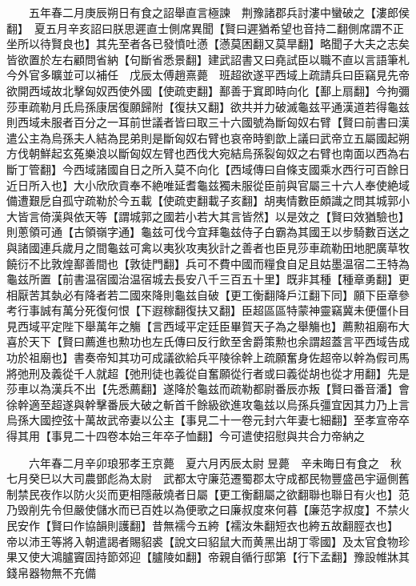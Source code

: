 　　五年春二月庚辰朔日有食之詔舉直言極諫　荆豫諸郡兵討漊中蠻破之【漊郎侯翻】　夏五月辛亥詔曰朕思遲直士側席異聞【賢曰遲猶希望也音持二翻側席謂不正坐所以待賢良也】其先至者各已發憤吐懣【懣莫困翻又莫旱翻】略聞子大夫之志矣皆欲置於左右顧問省納【句斷省悉景翻】建武詔書又曰堯試臣以職不直以言語筆札今外官多曠並可以補任　戊辰太傅趙熹薨　班超欲遂平西域上疏請兵曰臣竊見先帝欲開西域故北擊匈奴西使外國【使疏吏翻】鄯善于窴即時向化【鄯上扇翻】今拘彌莎車疏勒月氏烏孫康居復願歸附【復扶又翻】欲共并力破滅龜兹平通漢道若得龜兹則西域未服者百分之一耳前世議者皆曰取三十六國號為斷匈奴右臂【賢曰前書曰漢遣公主為烏孫夫人結為昆弟則是斷匈奴右臂也哀帝時劉歆上議曰武帝立五屬國起朔方伐朝鮮起玄菟樂浪以斷匈奴左臂也西伐大宛結烏孫裂匈奴之右臂也南面以西為右斷丁管翻】今西域諸國自日之所入莫不向化【西域傳曰自條支國乘水西行可百餘日近日所入也】大小欣欣貢奉不絶唯延耆龜兹獨未服從臣前與官屬三十六人奉使絶域備遭艱戹自孤守疏勒於今五載【使疏吏翻載子亥翻】胡夷情數臣頗識之問其城郭小大皆言倚漢與依天等【謂城郭之國若小若大其言皆然】以是效之【賢曰效猶驗也】則蔥領可通【古領嶺字通】龜兹可伐今宜拜龜兹侍子白霸為其國王以步騎數百送之與諸國連兵歲月之間龜兹可禽以夷狄攻夷狄計之善者也臣見莎車疏勒田地肥廣草牧饒衍不比敦煌鄯善間也【敦徒門翻】兵可不費中國而糧食自足且姑墨温宿二王特為龜兹所置【前書温宿國治温宿城去長安八千三百五十里】既非其種【種章勇翻】更相厭苦其埶必有降者若二國來降則龜兹自破【更工衡翻降戶江翻下同】願下臣章參考行事誠有萬分死復何恨【下遐稼翻復扶又翻】臣超區區特蒙神靈竊冀未便僵仆目見西域平定陛下舉萬年之觴【言西域平定廷臣畢賀天子為之舉觴也】薦勲祖廟布大喜於天下【賢曰薦進也勲功也左氏傳曰反行飲至舍爵策勲也余謂超蓋言平西域告成功於祖廟也】書奏帝知其功可成議欲給兵平陵徐幹上疏願奮身佐超帝以幹為假司馬將弛刑及義從千人就超【弛刑徒也義從自奮願從行者或曰義從胡也從才用翻】先是莎車以為漢兵不出【先悉薦翻】遂降於龜兹而疏勒都尉番辰亦叛【賢曰番音潘】會徐幹適至超遂與幹擊番辰大破之斬首千餘級欲進攻龜兹以烏孫兵彊宜因其力乃上言烏孫大國控弦十萬故武帝妻以公主【事見二十一卷元封六年妻七細翻】至孝宣帝卒得其用【事見二十四卷本始三年卒子恤翻】今可遣使招慰與共合力帝納之

　　六年春二月辛卯琅邪孝王京薨　夏六月丙辰太尉昱薨　辛未晦日有食之　秋七月癸巳以大司農鄧彪為太尉　武都太守廉范遷蜀郡太守成都民物豐盛邑宇逼側舊制禁民夜作以防火災而更相隱蔽燒者日屬【更工衡翻屬之欲翻聯也聯日有火也】范乃毁削先令但嚴使儲水而已百姓以為便歌之曰廉叔度來何暮【廉范字叔度】不禁火民安作【賢曰作協韻則護翻】昔無襦今五絝【襦汝朱翻短衣也絝五故翻脛衣也】　帝以沛王等將入朝遣謁者賜貂裘【說文曰貂鼠大而黄黑出胡丁零國】及太官食物珍果又使大鴻臚竇固持節郊迎【臚陵如翻】帝親自循行邸第【行下孟翻】豫設帷牀其錢帛器物無不充備

